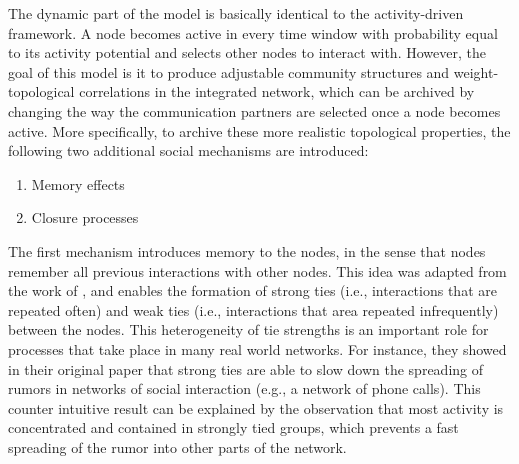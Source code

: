 The dynamic part of the model is basically identical to the activity-driven framework.
A node becomes active in every time window with probability equal to its activity potential and selects other nodes to interact with.
However, the goal of this model is it to produce adjustable community structures and weight-topological correlations in the integrated network, which can be archived by changing the way the communication partners are selected once a node becomes active.
More specifically, to archive these more realistic topological properties, the following two additional social mechanisms are introduced:

\begin{enumerate}
    \item Memory effects
    \item Closure processes
\end{enumerate}

The first mechanism introduces memory to the nodes, in the sense that nodes remember all previous interactions with other nodes.
This idea was adapted from the work of \citet{Karsai2014}, and enables the formation of strong ties (i.e., interactions that are repeated often) and weak ties (i.e., interactions that area repeated infrequently) between the nodes.
This heterogeneity of tie strengths is an important role for processes that take place in many real world networks.
For instance, they showed in their original paper that strong ties are able to slow down the spreading of rumors in networks of social interaction (e.g., a network of phone calls).
This counter intuitive result can be explained by the observation that most activity is concentrated and contained in strongly tied groups, which prevents a fast spreading of the rumor into other parts of the network.

